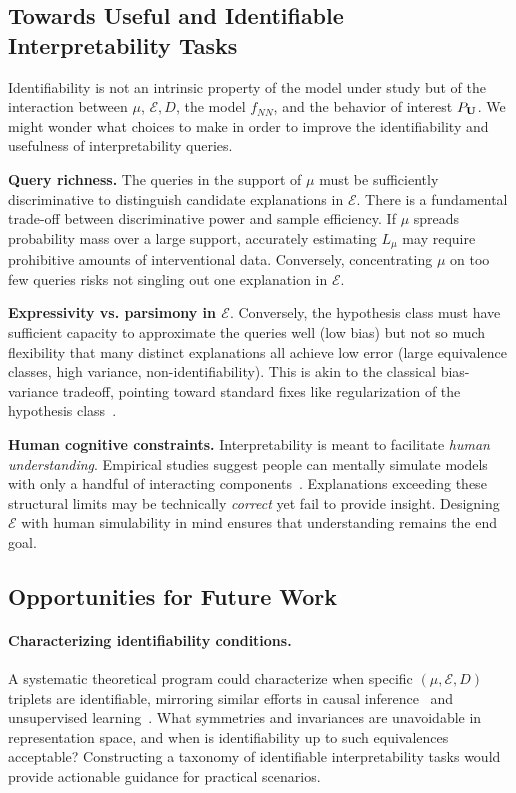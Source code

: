 \subsection{Towards Useful and Identifiable Interpretability Tasks}

Identifiability is not an intrinsic property of the model under study but of the interaction between $\mu$, $\mathcal{E}, D$, the model $f_{NN}$, and the behavior of interest $P_{\mathbf{U}}$. We might wonder what choices to make in order to improve the identifiability and usefulness of interpretability queries.

\textbf{Query richness.} The queries in the support of $\mu$ must be sufficiently discriminative to distinguish candidate explanations in $\mathcal{E}$. There is a fundamental trade-off between discriminative power and sample efficiency. If $\mu$ spreads probability mass over a large support, accurately estimating $L_\mu$ may require prohibitive amounts of interventional data. Conversely, concentrating $\mu$ on too few queries risks not singling out one explanation in $\mathcal{E}$.

\textbf{Expressivity vs. parsimony in $\mathcal{E}$}. Conversely, the hypothesis class must have sufficient capacity to approximate the queries well (low bias) but not so much flexibility that many distinct explanations all achieve low error (large equivalence classes, high variance, non-identifiability). This is akin to the classical bias-variance tradeoff, pointing toward standard fixes like regularization of the hypothesis class~\citep{belinkov-2022-probing}.

\textbf{Human cognitive constraints.} Interpretability is meant to facilitate \emph{human understanding}. Empirical studies suggest people can mentally simulate models with only a handful of interacting components~\citep{lombrozo2006structure,wilkenfeld2013understanding,keil2006explanation,hassija2024interpreting}. Explanations exceeding these structural limits may be technically \textit{correct} yet fail to provide insight. Designing $\mathcal{E}$ with human simulability in mind ensures that understanding remains the end goal.

\subsection{Opportunities for Future Work}

\paragraph{Characterizing identifiability conditions.}
A systematic theoretical program could characterize when specific $(\mu, \mathcal{E}, D)$ triplets are identifiable, mirroring similar efforts in causal inference~\citep{Shpitser2008} and unsupervised learning~\citep{Locatello2019,Khemakhem2020}. What symmetries and invariances are unavoidable in representation space, and when is identifiability up to such equivalences acceptable? Constructing a taxonomy of identifiable interpretability tasks would provide actionable guidance for practical scenarios.

